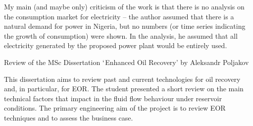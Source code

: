 \documentclass[14pt,twoside]{report}
\begin{document}
My main (and maybe only) criticism of the work is that there is no analysis on the consumption market for electricity -- the author assumed that there is a natural demand for power in Nigeria, but no numbers (or time series indicating the growth of consumption) were shown. In the analysis, he assumed that all electricity generated by the proposed power plant would be entirely used. 

\clearpage




\bigskip

\begin{center}
{\Large Review of the MSc Dissertation $\lq$Enhanced Oil Recovery' by Aleksandr Poljakov}
\end{center}

\medskip

This dissertation aims to review past and current technologies for oil recovery and, in particular, for EOR. The student presented a short review on the main technical factors that impact in the fluid flow behaviour under reservoir conditions. The primary engineering aim of the project is to review EOR techniques and to assess the business case.
\end{document}
